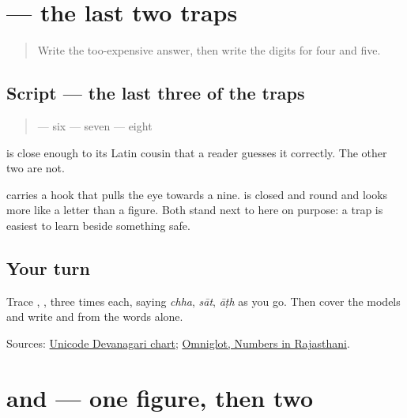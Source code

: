 \section[\texorpdfstring{\mw{६} \mw{७} \mw{८} (6 7 8)}{६ ७ ८ (6 7 8)}]{   — the last two traps}

\label{lesson:MW-W35-digits-six-seven-eight}



\begin{quote}
Write the too-expensive answer, then write the digits for four and five.
\end{quote}

\subsection*{Script — the last three of the traps}
\begin{quote}
\textbf{} — six  \textbf{} — seven  \textbf{} — eight
\end{quote}

\textbf{} is close enough to its Latin cousin that a reader guesses it correctly. The other two are not.

\textbf{} carries a hook that pulls the eye towards a nine. \textbf{} is closed and round and looks more like a letter than a figure. Both stand next to \textbf{} here on purpose: a trap is easiest to learn beside something safe.

\subsection*{Your turn}
Trace \textbf{}, \textbf{}, \textbf{} three times each, saying \emph{chha}, \emph{sāt}, \emph{āṭh} as you go. Then cover the models and write \textbf{} and \textbf{} from the words alone.

\begin{tcolorbox}[breakable,colback=teal!4,colframe=teal!35!black,title={Before you move on}]
Sources: \href{https://www.unicode.org/charts/PDF/U0900.pdf}{Unicode Devanagari chart}; \href{https://www.omniglot.com/language/numbers/rajasthani.htm}{Omniglot, Numbers in Rajasthani}.
\end{tcolorbox}
\section[Practice]{ and  — one figure, then two}

